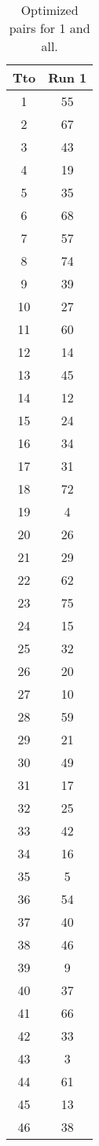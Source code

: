 \begin{table}
  \centering
  \scriptsize
  \caption{Optimized pairs for 1 and all.}
  \label{tab_pairs}
\begin{tabular}{c c }
\hline
Tto & Run 1 \\
\hline
1 & 55 \\
2 & 67 \\
3 & 43 \\
4 & 19 \\
5 & 35 \\
6 & 68 \\
7 & 57 \\
8 & 74 \\
9 & 39 \\
10 & 27 \\
11 & 60 \\
12 & 14 \\
13 & 45 \\
14 & 12 \\
15 & 24 \\
16 & 34 \\
17 & 31 \\
18 & 72 \\
19 & 4 \\
20 & 26 \\
21 & 29 \\
22 & 62 \\
23 & 75 \\
24 & 15 \\
25 & 32 \\
26 & 20 \\
27 & 10 \\
28 & 59 \\
29 & 21 \\
30 & 49 \\
31 & 17 \\
32 & 25 \\
33 & 42 \\
34 & 16 \\
35 & 5 \\
36 & 54 \\
37 & 40 \\
38 & 46 \\
39 & 9 \\
40 & 37 \\
41 & 66 \\
42 & 33 \\
43 & 3 \\
44 & 61 \\
45 & 13 \\
46 & 38 \\

\end{tabular}
\end{table}
